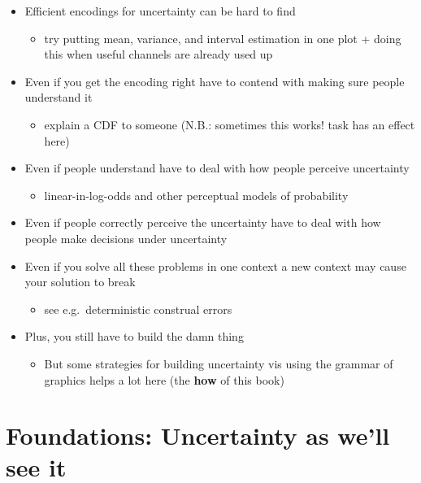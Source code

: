 \documentclass[]{book}
\providecommand{\tightlist}{%
  \setlength{\itemsep}{0pt}\setlength{\parskip}{0pt}}
\theoremstyle{definition}
\theoremstyle{definition}
\theoremstyle{definition}
\theoremstyle{remark}
\begin{document}
\begin{itemize}
\tightlist
\item
  Efficient encodings for uncertainty can be hard to find

  \begin{itemize}
  \tightlist
  \item
    try putting mean, variance, and interval estimation in one plot +
    doing this when useful channels are already used up
  \end{itemize}
\item
  Even if you get the encoding right have to contend with making sure
  people understand it

  \begin{itemize}
  \tightlist
  \item
    explain a CDF to someone (N.B.: sometimes this works! task has an
    effect here)
  \end{itemize}
\item
  Even if people understand have to deal with how people perceive
  uncertainty

  \begin{itemize}
  \tightlist
  \item
    linear-in-log-odds and other perceptual models of probability
  \end{itemize}
\item
  Even if people correctly perceive the uncertainty have to deal with
  how people make decisions under uncertainty
\item
  Even if you solve all these problems in one context a new context may
  cause your solution to break

  \begin{itemize}
  \tightlist
  \item
    see e.g.~deterministic construal errors
  \end{itemize}
\item
  Plus, you still have to build the damn thing

  \begin{itemize}
  \tightlist
  \item
    But some strategies for building uncertainty vis using the grammar
    of graphics helps a lot here (the \textbf{how} of this book)
  \end{itemize}
\end{itemize}

\hypertarget{ch-uncertainty}{%
\chapter{Foundations: Uncertainty as we'll see
it}\label{ch-uncertainty}}
\end{document}
